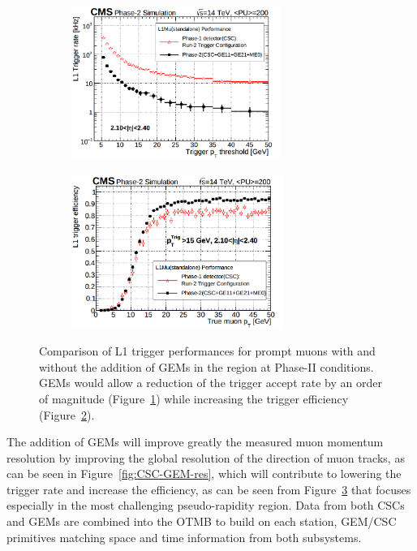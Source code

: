 	\begin{figure}[H]
		\begin{subfigure}{0.5\linewidth}
			\centering
			\includegraphics[height=5cm]{fig/chapt3/GEM-trigger-rate.png}
			\caption{\label{fig:CSC-GEM-perf:A}}
		\end{subfigure}
		\begin{subfigure}{0.5\linewidth}
			\centering
			\includegraphics[height=5cm]{fig/chapt3/GEM-trigger-eff.png}
			\caption{\label{fig:CSC-GEM-perf:B}}
		\end{subfigure}
		\caption{\label{fig:CSC-GEM-perf} Comparison of L1 trigger performances for prompt muons with and without the addition of GEMs in the region  at Phase-II conditions. GEMs would allow a reduction of the trigger accept rate by an order of magnitude (Figure~\ref{fig:CSC-GEM-perf:A}) while increasing the trigger efficiency (Figure~\ref{fig:CSC-GEM-perf:B}).}
	\end{figure}
	
	The addition of GEMs will improve greatly the measured muon momentum resolution by improving the global resolution of the direction of muon tracks, as can be seen in Figure~\ref{fig:CSC-GEM-res}, which will contribute to lowering the trigger rate and increase the efficiency, as can be seen from Figure~\ref{fig:CSC-GEM-perf} that focuses especially in the most challenging pseudo-rapidity region. Data from both CSCs and GEMs are combined into the OTMB to build on each station, GEM/CSC primitives matching space and time information from both subsystems.
	
